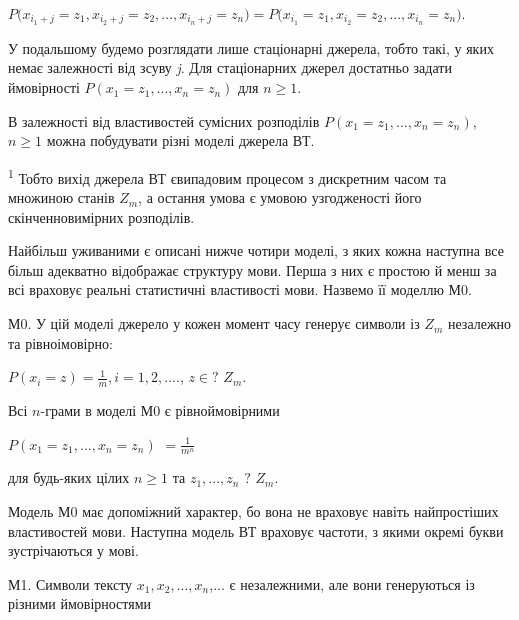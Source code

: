 \documentclass[a4paper]{article}
\newcounter{}
\begin{document}
{\centering

${P(x_{{i_{{1}}+j}}=z_{1}{,x_{i_{{2}}+j}}{=z_{2}}{,\text{.}\text{.}\text{.},x_{i_{{n}}+j}}{=z_{n}}{)=P(x_{i_{{1}}}}{=z_{1}}{,x_{i_{{2}}}}{=z_{2}}{,\text{.}\text{.}\text{.},x_{i_{{n}}}}{=z_{n}}{)}}$.
\par}

У подальшому будемо розглядати лише стаціонарні джерела, тобто такі, у яких
немає залежності від зсуву \textit{j}. Для стаціонарних джерел достатньо задати
ймовірності  ${P(x_{{1}}=z_{{1}},\text{.}\text{.}\text{.},x_{{n}}=z_{{n}})}$
для  ${n\ge 1}$.

В залежності від властивостей сумісних розподілів 
${P(x_{{1}}=z_{{1}},\text{.}\text{.}\text{.},x_{{n}}=z_{{n}})}$,  ${n\ge 1}$
можна побудувати різні моделі джерела ВТ.


\bigskip


\bigskip

\textsuperscript{1} Тобто вихід джерела ВТ євипадовим процесом з дискретним
часом та множиною станів  ${Z_{{m}}}$, а остання умова є умовою узгодженості
його скінченновимірних розподілів.


\bigskip

Найбільш уживаними є описані нижче чотири моделі, з яких кожна наступна все
більш адекватно відображає структуру мови. Перша з них є простою й менш за всі
враховує реальні статистичні властивості мови. Назвемо її моделлю М0.

М0. У цій моделі джерело у кожен момент часу генерує символи із  ${Z_{{m}}}$
незалежно та рівноімовірно:

{\centering
 ${P\left(x_{{i}}=z\right)=\frac{1}{m},i=1,2,\text{.}\text{.}\text{.}}$.,  
${z\in ?}$ ${Z_{{m}}}$.
\par}

Всі  ${n}${}-грами в моделі М0 є рівноймовірними

{\centering  ${P(x_{{1}}=z_{{1}},\text{.}\text{.}\text{.},x_{{n}}=z_{{n}})}$
${=\frac{1}{m^{{n}}}}$\par}

для  будь-яких цілих  ${n\ge 1}$ та 
${z_{{1}},\text{.}\text{.}\text{.},z_{{n}}}$ ${?}$ ${Z_{{m}}}$.

Модель М0 має допоміжний характер, бо вона не враховує навіть найпростіших
властивостей мови. Наступна модель ВТ враховує частоти, з якими окремі букви
зустрічаються у мові.

М1. Символи тексту  ${x_{{1}},x_{{2}},\text{.}\text{.}\text{.},x_{{n}}}$,... є
незалежними, але вони генеруються із різними ймовірностями
\end{document}
